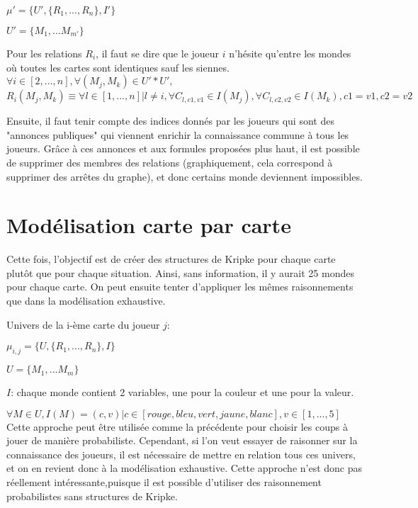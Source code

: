 \documentclass{article}
\begin{document}
$   \mu'=\{U',\{R_{1},...,R_{n}\},I' \} $

$   U'=\{M_{1},...M_{m'} \} $

\newpage
Pour les relations $R_{i}$, il faut se dire que le joueur $i$ n'hésite qu'entre les mondes où toutes les cartes sont identiques sauf les siennes.
\smallbreak
$   \forall i \in [2,...,n] ,  \forall (M_{j},M_{k}) \in U'*U',$
\smallbreak
$R_{i}(M_{j},M_{k}) 
\equiv
\forall l \in [1,...,n]|l \ne i,  \forall C_{l,c1,v1} \in  I(M_{j}), \forall C_{l,c2,v2} \in  I(M_{k}), c1=v1, c2=v2    $

Ensuite, il faut tenir compte des indices donnés par les joueurs qui sont des "annonces publiques" qui viennent enrichir la connaissance commune à tous les joueurs. Grâce à ces annonces et aux formules proposées plus haut, il est possible de supprimer des membres des relations (graphiquement, cela correspond à supprimer des arrêtes du graphe), et donc certains monde deviennent impossibles.

\section{Modélisation carte par carte}

Cette fois, l'objectif est de créer des structures de Kripke pour chaque carte plutôt que pour chaque situation. Ainsi, sans information, il y aurait 25 mondes pour chaque carte. On peut ensuite tenter d'appliquer les mêmes raisonnements que dans la modélisation exhaustive.

Univers de la i-ème carte du joueur $j$:

$   \mu_{i,j}=\{U,\{R_{1},...,R_{n}\},I \}  $

$   U=\{M_{1},...M_{m} \}   $

$I$: chaque monde contient 2 variables, une pour la couleur et une pour la valeur. 

$\forall M \in U, I(M)=(c,v)|c\in[rouge,bleu,vert,jaune,blanc],v\in[1,...,5]$
\smallbreak
Cette approche peut être utilisée comme la précédente pour choisir les coups à jouer de manière probabiliste. Cependant, si l'on veut essayer de raisonner sur la connaissance des joueurs, il est nécessaire de mettre en relation tous ces univers, et on en revient donc à la modélisation exhaustive. Cette approche n'est donc pas réellement intéressante,puisque il est possible d'utiliser des raisonnement probabilistes sans structures de Kripke. 
\end{document}
